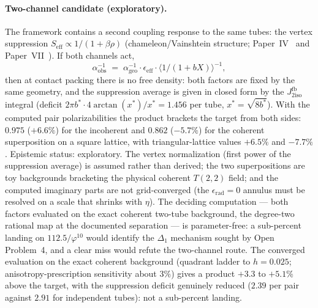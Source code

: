 \documentclass[11pt,a4paper]{article}
\theoremstyle{definition}
\theoremstyle{remark}
\newcommand{\vp}{\varphi}
\newcommand{\Jfb}{J_{2\mathrm{iso}}^{\mathrm{fb}}}
\newcommand{\aInv}{\alpha^{-1}}
\begin{document}
\paragraph{Two-channel candidate (exploratory).}
The framework contains a second coupling response to the same tubes:
the vertex suppression $S_{\mathrm{eff}} \propto 1/(1+\beta\rho)$
(chameleon/Vainshtein structure; Paper~IV~\cite{Paper4} and
Paper~VII~\cite{Paper7}). If both channels act,
\[
  \aInv_{\mathrm{obs}} \;=\; \aInv_{\mathrm{geo}}\cdot
  \epsilon_{\mathrm{eff}}\cdot
  \bigl\langle 1/(1+bX)\bigr\rangle^{-1},
\]
then at contact packing there is no free density: both factors are
fixed by the same geometry, and the suppression average is given in
closed form by the $\Jfb$ integral (deficit
$2\pi b^*\cdot 4\arctan(x^*)/x^* = 1.456$ per tube, $x^*=\sqrt{8b^*}$).
With the computed pair polarizabilities the product brackets the target
from both sides: $0.975$ ($+6.6\%$) for the incoherent and $0.862$
($-5.7\%$) for the coherent superposition on a square lattice, with
triangular-lattice values $+6.5\%$ and $-7.7\%$. Epistemic status:
exploratory. The vertex normalization (first power of the suppression
average) is assumed rather than derived; the two superpositions are toy
backgrounds bracketing the physical coherent $T(2,2)$ field; and the
computed imaginary parts are not grid-converged (the
$\epsilon_{\mathrm{rad}}=0$ annulus must be resolved on a scale that
shrinks with $\eta$). The deciding computation --- both factors
evaluated on the exact coherent two-tube background, the degree-two
rational map at the documented separation --- is parameter-free: a
sub-percent landing on $112.5/\vp^{10}$ would identify the $\Delta_1$
mechanism sought by Open Problem~4, and a clear miss would refute the
two-channel route. The converged evaluation on the exact coherent
background (quadrant ladder to $h=0.025$; anisotropy-prescription
sensitivity about $3\%$) gives a product $+3.3$ to $+5.1\%$ above the
target, with the suppression deficit genuinely reduced ($2.39$ per
pair against $2.91$ for independent tubes): not a sub-percent landing.
\end{document}
